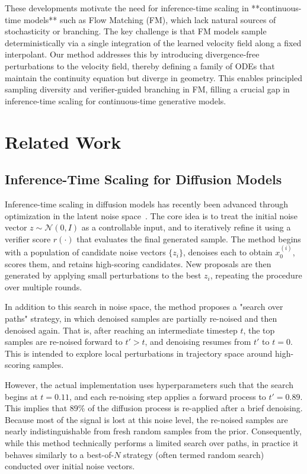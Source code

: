 \documentclass{article}
\begin{document}
These developments motivate the need for inference-time scaling in **continuous-time models** such as Flow Matching (FM), which lack natural sources of stochasticity or branching. The key challenge is that FM models sample deterministically via a single integration of the learned velocity field along a fixed interpolant. Our method addresses this by introducing divergence-free perturbations to the velocity field, thereby defining a family of ODEs that maintain the continuity equation but diverge in geometry. This enables principled sampling diversity and verifier-guided branching in FM, filling a crucial gap in inference-time scaling for continuous-time generative models.


\section{Related Work}
\label{sec:related}

\subsection{Inference-Time Scaling for Diffusion Models}

Inference-time scaling in diffusion models has recently been advanced through optimization in the latent noise space~\cite{ma2025diffits}. The core idea is to treat the initial noise vector \( z \sim \mathcal{N}(0, I) \) as a controllable input, and to iteratively refine it using a verifier score \( r(\cdot) \) that evaluates the final generated sample. The method begins with a population of candidate noise vectors \( \{z_i\} \), denoises each to obtain \( x_0^{(i)} \), scores them, and retains high-scoring candidates. New proposals are then generated by applying small perturbations to the best \( z_i \), repeating the procedure over multiple rounds.

In addition to this search in noise space, the method proposes a "search over paths" strategy, in which denoised samples are partially re-noised and then denoised again. That is, after reaching an intermediate timestep \( t \), the top samples are re-noised forward to \( t' > t \), and denoising resumes from \( t' \) to \( t = 0 \). This is intended to explore local perturbations in trajectory space around high-scoring samples.

However, the actual implementation uses hyperparameters such that the search begins at \( t = 0.11 \), and each re-noising step applies a forward process to \( t' = 0.89 \). This implies that 89\% of the diffusion process is re-applied after a brief denoising. Because most of the signal is lost at this noise level, the re-noised samples are nearly indistinguishable from fresh random samples from the prior. Consequently, while this method technically performs a limited search over paths, in practice it behaves similarly to a best-of-\( N \) strategy (often termed random search) conducted over initial noise vectors.
\end{document}
